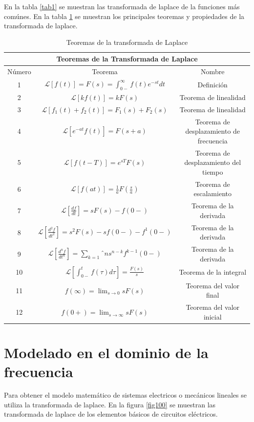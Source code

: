 \documentclass[12pt]{book}
\theoremstyle{definition}
\theoremstyle{remark}
\theoremstyle{plain}
\begin{document}
En la  tabla \ref{tab1}  se muestran las transformada de laplace de la funciones más comúnes. En la tabla \ref{tab2} se muestran los principales teoremas y propiedades de la transformada de laplace.

\begin{table}[!hbt]
\begin{center}
\begin{tabular}{|c|c|c|}
\hline
\multicolumn{3}{|c|}{Teoremas de la Transformada de Laplace}\\
\hline
Número & Teorema & Nombre \\
\hline
\hline
1 & $\mathcal{L} [f(t)] = F(s) = \int_{0-}^{\infty}f(t) e^{-s t}d t $ & Definición\\
\hline
2 &$ \mathcal{L} [k f(t)]  = k F(s) $ & Teorema de linealidad \\
\hline
3 & $\mathcal{L} [ f_1 (t)+ f_2 (t)] = F_1 (s) + F_2 (s)$ & Teorema de linealidad \\
\hline
4 & $\mathcal{L} [e^{-a t} f(t)]  = F(s+a) $& Teorema de desplazamiento de frecuencia \\
\hline
5 & $\mathcal{L} [f(t-T)]  = e^{s T} F(s)$ & Teorema de desplazamiento del tiempo \\
\hline
6 & $\mathcal{L} [f(a t)]  = \frac{1}{a} F(\frac{s}{a}) $ & Teorema de escalamiento \\
\hline
7 & $\mathcal{L} [\frac{d f}{d t}]  = s F(s)- f(0-)$ & Teorema de la derivada \\
\hline
8 & $\mathcal{L} [\frac{d ^2 f}{d t^2}]  = s^2 F(s) - s f(0-)-f^1(0-)$ & Teorema de la derivada \\
\hline
9 & $\mathcal{L} [\frac{d ^n f}{d t^n}]  = \sum_{k=1}ˆn s^{n-k} f^{k-1}(0-)$ & Teorema de la derivada \\
\hline
10 & $\mathcal{L} [\int_{0-}^t f(\tau) d \tau ]  = \frac{F(s)}{s} $ & Teorema de la integral \\
\hline
11 & $f(\infty)  = \lim_{s \to 0} s F(s)$ & Teorema del valor final \\
\hline
12 & $f(0+)  = \lim_{s \to \infty} s F(s)$ & Teorema del valor inicial \\
\hline
\end{tabular}
\end{center}
\caption{Teoremas de la transformada de Laplace}
\label{tab2}
\end{table}

\section{Modelado en el dominio de la frecuencia}
Para obtener el modelo matemático de sistemas electricos o mecánicos lineales se utiliza la transformada de laplace. En la figura \ref{fig100} se muestran las transformada de laplace de los elementos básicos de circuitos eléctricos. 
\end{document}
